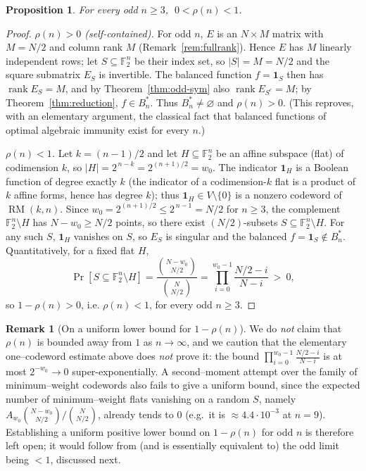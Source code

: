 \documentclass{amsart}
\newtheorem{proposition}[theorem]{Proposition}
\theoremstyle{definition}
\newtheorem{remark}[theorem]{Remark}
\DeclareMathOperator{\RM}{RM}
\DeclareMathOperator{\rank}{rank}
\newcommand{\F}{\mathbb{F}}
\begin{document}
\begin{proposition}\label{prop:oddbounds}
For every odd $n\ge3$, $\;0<\rho(n)<1$.
\end{proposition}
\begin{proof}
\emph{$\rho(n)>0$ (self-contained).} For odd $n$, $E$ is an $N\times M$
matrix with $M=N/2$ and column rank $M$ (Remark~\ref{rem:fullrank}).
Hence $E$ has $M$ linearly independent rows; let $S\subseteq\F_2^n$ be
their index set, so $|S|=M=N/2$ and the square submatrix $E_S$ is
invertible. The balanced function $f=\mathbf 1_S$ then has
$\rank E_S=M$, and by Theorem~\ref{thm:odd-sym} also $\rank E_{S^c}=M$;
by Theorem~\ref{thm:reduction}, $f\in B_n^*$. Thus $B_n^*\ne\varnothing$
and $\rho(n)>0$. (This reproves, with an elementary argument, the
classical fact that balanced functions of optimal algebraic immunity
exist for every $n$.)

\emph{$\rho(n)<1$.} Let $k=(n-1)/2$ and let $H\subseteq\F_2^n$ be an
affine subspace (flat) of codimension $k$, so $|H|=2^{\,n-k}=2^{(n+1)/2}=w_0$.
The indicator $\mathbf 1_H$ is a Boolean function of degree exactly $k$
(the indicator of a codimension-$k$ flat is a product of $k$ affine forms,
hence has degree $k$); thus $\mathbf 1_H\in V\setminus\{0\}$ is a
nonzero codeword of $\RM(k,n)$. Since $w_0=2^{(n+1)/2}\le 2^{\,n-1}=N/2$
for $n\ge3$, the complement $\F_2^n\setminus H$ has $N-w_0\ge N/2$ points,
so there exist $(N/2)$-subsets $S\subseteq\F_2^n\setminus H$. For any such
$S$, $\mathbf 1_H$ vanishes on $S$, so $E_S$ is singular and the balanced
$f=\mathbf 1_S\notin B_n^*$. Quantitatively, for a fixed flat $H$,
\[
\Pr[S\subseteq\F_2^n\setminus H]
=\frac{\binom{N-w_0}{N/2}}{\binom{N}{N/2}}
=\prod_{i=0}^{w_0-1}\frac{N/2-i}{N-i}\ >\ 0,
\]
so $1-\rho(n)>0$, i.e. $\rho(n)<1$, for every odd $n\ge3$.
\end{proof}

\begin{remark}[On a uniform lower bound for $1-\rho(n)$]\label{rem:notuniform}
We do \emph{not} claim that $\rho(n)$ is bounded away from $1$ as
$n\to\infty$, and we caution that the elementary one--codeword estimate
above does \emph{not} prove it: the bound
$\prod_{i=0}^{w_0-1}\frac{N/2-i}{N-i}$ is at most $2^{-w_0}\to0$
super-exponentially. A second--moment attempt over the family of
minimum--weight codewords also fails to give a uniform bound, since the
expected number of minimum--weight flats vanishing on a random $S$,
namely $A_{w_0}\binom{N-w_0}{N/2}/\binom{N}{N/2}$, already tends to $0$
(e.g.\ it is $\approx4.4\cdot10^{-3}$ at $n=9$). Establishing a uniform
positive lower bound on $1-\rho(n)$ for odd $n$ is therefore left open; it
would follow from (and is essentially equivalent to) the odd limit being
$<1$, discussed next.
\end{remark}
\end{document}
